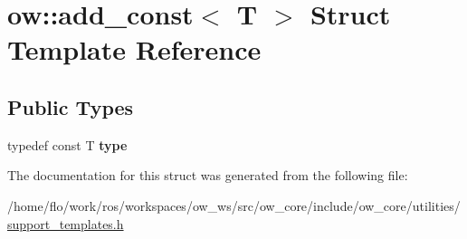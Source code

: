 \hypertarget{structow_1_1add__const}{}\section{ow\+:\+:add\+\_\+const$<$ T $>$ Struct Template Reference}
\label{structow_1_1add__const}
\subsection*{Public Types}
\begin{DoxyCompactItemize}
\item 
typedef const T {\bfseries type}\hypertarget{structow_1_1add__const_ae79cad7d37e8b018533742777763a726}{}\label{structow_1_1add__const_ae79cad7d37e8b018533742777763a726}

\end{DoxyCompactItemize}


The documentation for this struct was generated from the following file\+:\begin{DoxyCompactItemize}
\item 
/home/flo/work/ros/workspaces/ow\+\_\+ws/src/ow\+\_\+core/include/ow\+\_\+core/utilities/\hyperlink{support__templates_8h}{support\+\_\+templates.\+h}\end{DoxyCompactItemize}
